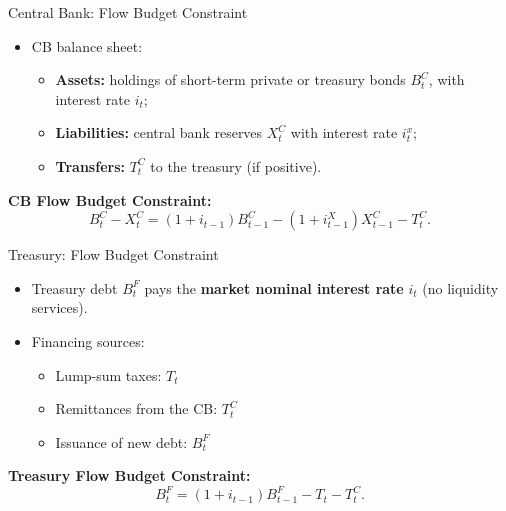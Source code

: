 \documentclass[11pt,aspectratio=169]{beamer}
\begin{document}
\begin{frame}{Central Bank: Flow Budget Constraint}
\small
\begin{itemize}
    \item CB balance sheet:
    \begin{itemize}
        \item \textbf{Assets:} holdings of short-term private or treasury bonds $B_t^C$, with interest rate $i_t$;
        \item \textbf{Liabilities:} central bank reserves $X_t^C$ with interest rate $i_t^x$;
        \item \textbf{Transfers:} $T_t^C$ to the treasury (if positive).
    \end{itemize}
    \vspace{1em}
    \end{itemize}
\vspace{0.5em}    
\textbf{CB Flow Budget Constraint:}
    \begin{equation}
    B_{t}^{C}-X_{t}^{C}=(1+i_{t-1})B_{t-1}^{C}-(1+i_{t-1}^{X})X_{t-1}^{C}-T_{t}^{C}.
    \label{cb_budget}
    \end{equation}
\end{frame}


\begin{frame}{Treasury: Flow Budget Constraint}
\small
\begin{itemize}
    \item Treasury debt $B_t^F$ pays the \textbf{market nominal interest rate} $i_t$ (no liquidity services).  
    \item Financing sources:
    \begin{itemize}
        \item Lump-sum taxes: $T_t$  
        \item Remittances from the CB: $T_t^C$  
        \item Issuance of new debt: $B_t^F$
    \end{itemize}
    \end{itemize}
\vspace{0.5em}    
\textbf{Treasury Flow Budget Constraint:}
    \begin{equation}\label{treasury_budget}
    B_{t}^{F}=(1+i_{t-1})B_{t-1}^{F}-T_{t}-T_{t}^{C}.
    \end{equation} 
\end{frame}

\end{document}
